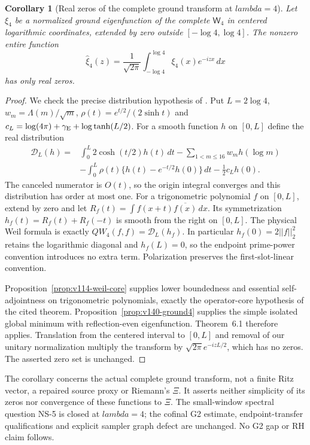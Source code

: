\documentclass[11pt]{article}
\def\lambda{lambda}%
\def\norm#1{||#1||}%
\newtheorem{corollary}[theorem]{Corollary}
\theoremstyle{remark}
\newcommand{\norm}[1]{\left\lVert #1\right\rVert}
\begin{document}
\begin{corollary}[Real zeros of the complete ground transform at $\lambda=4$]
\label{cor:v140-real-zeros}
Let $\xi_4$ be a normalized ground eigenfunction of the complete
$\mathsf W_4$ in centered logarithmic coordinates, extended by zero
outside $[-\log4,\log4]$. The nonzero entire function
\[
 \widehat\xi_4(z)=\frac1{\sqrt{2\pi}}
       \int_{-\log4}^{\log4}\xi_4(x)e^{-izx}\,dx
\]
has only real zeros.
\end{corollary}
\begin{proof}
We check the precise distribution hypothesis of
\cite[Theorem~6.1 and Remark~4.3]{ConnesVanSuijlekom2025}.
Put $L=2\log4$, $w_m=\Lambda(m)/\sqrt m$,
$\rho(t)=e^{t/2}/(2\sinh t)$ and
$c_L=\log(4\pi)+\gamma_{\rm E}+\log\tanh(L/2)$.
For a smooth function $h$ on $[0,L]$ define the real distribution
\begin{align*}
 \mathcal D_L(h)={}&\int_0^L2\cosh(t/2)h(t)\,dt
       -\sum_{1<m\le16}w_m h(\log m)\\
 &-\int_0^L\rho(t)\{h(t)-e^{-t/2}h(0)\}\,dt
       -\tfrac12c_Lh(0).
\end{align*}
The canceled numerator is $O(t)$, so the origin integral converges
and this distribution has order at most one. For a trigonometric
polynomial $f$ on $[0,L]$, extend by zero and let
$R_f(t)=\int f(x+t)\overline{f(x)}\,dx$. Its symmetrization
$h_f(t)=R_f(t)+R_f(-t)$ is smooth from the right on $[0,L]$.
The physical Weil formula is exactly
$QW_4(f,f)=\mathcal D_L(h_f)$. In particular
$h_f(0)=2\norm f_2^2$ retains the logarithmic diagonal and
$h_f(L)=0$, so the endpoint prime-power convention introduces no
extra term. Polarization preserves the first-slot-linear convention.

Proposition~\ref{prop:v114-weil-core} supplies lower boundedness
and essential self-adjointness on trigonometric polynomials, exactly
the operator-core hypothesis of the cited theorem.
Proposition~\ref{prop:v140-ground4} supplies the simple isolated
global minimum with reflection-even eigenfunction. Theorem~6.1
therefore applies. Translation from the centered interval to $[0,L]$
and removal of our unitary normalization multiply the transform by
$\sqrt{2\pi}e^{-izL/2}$, which has no zeros. The asserted zero set
is unchanged.
\end{proof}

The corollary concerns the actual complete ground transform, not a
finite Ritz vector, a repaired source proxy or Riemann's $\Xi$.
It asserts neither simplicity of its zeros nor convergence of these
functions to $\Xi$. The small-window spectral question NS-5 is
closed at $\lambda=4$; the cofinal G2 estimate, endpoint-transfer
qualifications and explicit sampler graph defect are unchanged.
No G2 gap or RH claim follows.
\end{document}
